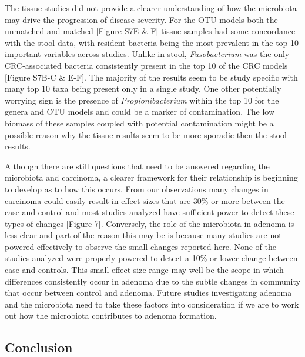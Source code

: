 \documentclass[12pt,]{article}
\begin{document}
The tissue studies did not provide a clearer understanding of how the
microbiota may drive the progression of disease severity. For the OTU
models both the unmatched and matched {[}Figure S7E \& F{]} tissue
samples had some concordance with the stool data, with resident bacteria
being the most prevalent in the top 10 important variables across
studies. Unlike in stool, \emph{Fusobacterium} was the only
CRC-associated bacteria consistently present in the top 10 of the CRC
models {[}Figure S7B-C \& E-F{]}. The majority of the results seem to be
study specific with many top 10 taxa being present only in a single
study. One other potentially worrying sign is the presence of
\emph{Propionibacterium} within the top 10 for the genera and OTU models
and could be a marker of contamination. The low biomass of these samples
coupled with potential contamination might be a possible reason why the
tissue results seem to be more sporadic then the stool results.

Although there are still questions that need to be answered regarding
the microbiota and carcinoma, a clearer framework for their relationship
is beginning to develop as to how this occurs. From our observations
many changes in carcinoma could easily result in effect sizes that are
30\% or more between the case and control and most studies analyzed have
sufficient power to detect these types of changes {[}Figure 7{]}.
Conversely, the role of the microbiota in adenoma is less clear and part
of the reason this may be is because many studies are not powered
effectively to observe the small changes reported here. None of the
studies analyzed were properly powered to detect a 10\% or lower change
between case and controls. This small effect size range may well be the
scope in which differences consistently occur in adenoma due to the
subtle changes in community that occur between control and adenoma.
Future studies investigating adenoma and the microbiota need to take
these factors into consideration if we are to work out how the
microbiota contributes to adenoma formation.

\newpage

\subsection{Conclusion}\label{conclusion}
\end{document}
